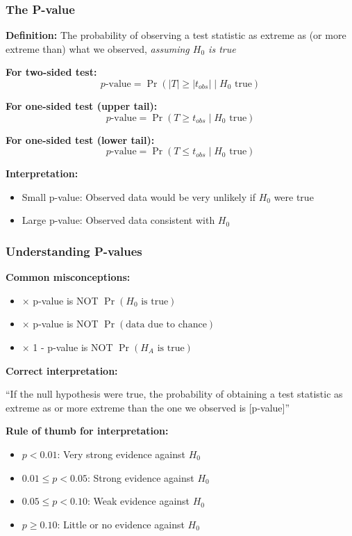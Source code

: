 \documentclass{beamer}
\begin{document}
\begin{frame}
\frametitle{The P-value}
\textbf{Definition:} The probability of observing a test statistic as extreme as (or more extreme than) what we observed, \textit{assuming $H_0$ is true}

\vspace{0.5cm}
\textbf{For two-sided test:}
$$p\text{-value} = \Pr(|T| \geq |t_{obs}| \mid H_0 \text{ true})$$

\vspace{0.3cm}
\textbf{For one-sided test (upper tail):}
$$p\text{-value} = \Pr(T \geq t_{obs} \mid H_0 \text{ true})$$

\vspace{0.3cm}
\textbf{For one-sided test (lower tail):}
$$p\text{-value} = \Pr(T \leq t_{obs} \mid H_0 \text{ true})$$

\vspace{0.5cm}
\textbf{Interpretation:}
\begin{itemize}
\item Small p-value: Observed data would be very unlikely if $H_0$ were true
\item Large p-value: Observed data consistent with $H_0$
\end{itemize}
\end{frame}

\begin{frame}
\frametitle{Understanding P-values}
\textbf{Common misconceptions:}

\vspace{0.3cm}
\begin{itemize}
\item $\times$ p-value is NOT $\Pr(H_0 \text{ is true})$
\item $\times$ p-value is NOT $\Pr(\text{data due to chance})$
\item $\times$ 1 - p-value is NOT $\Pr(H_A \text{ is true})$
\end{itemize}

\vspace{0.5cm}
\textbf{Correct interpretation:}

\vspace{0.3cm}
``If the null hypothesis were true, the probability of obtaining a test statistic as extreme as or more extreme than the one we observed is [p-value]''

\vspace{0.5cm}
\textbf{Rule of thumb for interpretation:}
\begin{itemize}
\item $p < 0.01$: Very strong evidence against $H_0$
\item $0.01 \leq p < 0.05$: Strong evidence against $H_0$
\item $0.05 \leq p < 0.10$: Weak evidence against $H_0$
\item $p \geq 0.10$: Little or no evidence against $H_0$
\end{itemize}
\end{frame}
\end{document}
